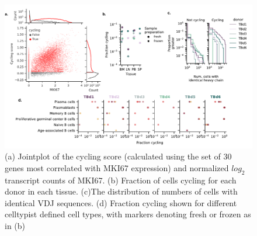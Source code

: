 \begin{figure}
    \centering
    \includegraphics[width=\textwidth, keepaspectratio]{figs/Tabula_Bursa/EDFigure1.pdf}
    \caption[Cell cycle analysis across tissues.] {(a) Jointplot of the cycling score (calculated using the set of 30 genes most correlated with MKI67 expression) and normalized $log_2$ transcript counts of MKI67. (b) Fraction of cells cycling for each donor in each tissue. (c)The distribution of numbers of cells with identical VDJ sequences. (d) Fraction cycling shown for different celltypist defined cell types, with markers denoting fresh or frozen as in (b) }
\label{ED:cycling}
\end{figure}
